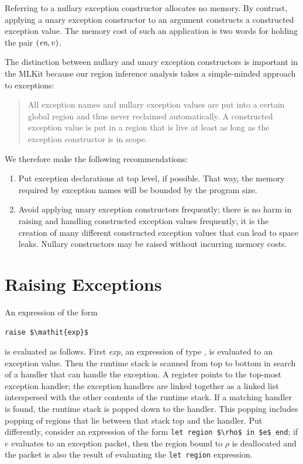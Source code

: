 \documentclass[12pt]{book}
\begin{document}
Referring to a nullary exception constructor allocates no memory. By contrast,
applying a unary exception constructor to an argument constructs a constructed
exception value. The memory cost of such an application is two words for holding
the pair $(\hbox{\it en}, v)$.

The distinction between nullary and unary exception constructors is important in
the MLKit because our region inference analysis takes a simple-minded approach
to exceptions:
\begin{quote}
  All exception names and nullary exception values are put into a certain
  global region and thus never reclaimed automatically. A constructed exception
  value is put in a region that is live at least as long as the exception
  constructor is in scope.
\end{quote}
We therefore make the following recommendations:
\begin{enumerate}
\item Put exception declarations at top level, if possible.  That way, the
  memory required by exception names will be bounded by the program size.
\item Avoid applying unary exception constructors frequently; there is no harm
  in raising and handling constructed exception values frequently; it is the
  creation of many different constructed exception values that can lead to space
  leaks. Nullary constructors may be raised without incurring memory costs.
\end{enumerate}

\section{Raising Exceptions}

An expression of the form
%
%
%
\begin{center}
  \lstinline!raise $\mathit{exp}$!
\end{center}
is evaluated as follows. First {\it exp}, an expression of type , is
evaluated to an exception value.  Then the runtime
%
%
%
stack is scanned from top to bottom in search of a handler that can handle the
exception. A register points to the top-most exception handler; the exception
handlers are linked together as a linked list interspersed with the other
contents of the runtime stack.  If a matching handler is found, the runtime
stack is popped down to the handler. This popping includes popping of regions
that lie between that stack top and the handler. Put differently, consider an
expression of the form
%
%
%
\lstinline!let region $\rho$ in $e$ end!; if $e$ evaluates to an exception
packet, then the region bound to $\rho$ is deallocated and the packet is also
the result of evaluating the \lstinline{let region} expression.
\end{document}
